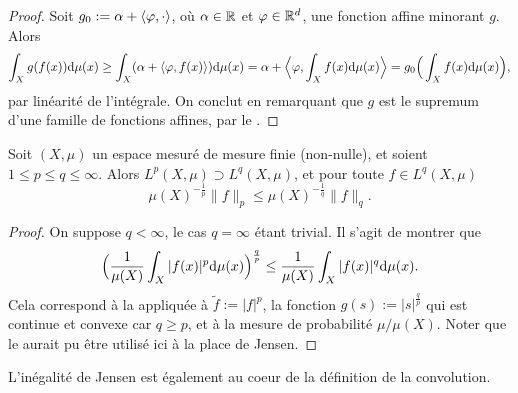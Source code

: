 \begin{proof}
	Soit $g_0 := \alpha + \langle\varphi,\cdot\rangle$, où $\alpha \in \mathbb{R}$ et $\varphi \in \mathbb{R}^d$, une fonction affine minorant $g$. Alors 
	\begin{equation*}
		\int_X g(f(x)) \mathrm{d} \mu(x) \geq \int_X (\alpha + \langle\varphi,f(x)\rangle) \mathrm{d} \mu(x) = \alpha + \Big\langle\varphi, \int_X f(x) \mathrm{d} \mu(x)\Big\rangle = g_0\Big(\int_X f(x) \mathrm{d} \mu(x)\Big),
	\end{equation*}
	par linéarité de l'intégrale.
	On conclut en remarquant que $g$ est le supremum d'une famille de fonctions affines, par le . %
\end{proof}


\begin{corollary}
\label{corol:lpInclusLq}
%
	Soit $(X,\mu)$ un espace mesuré de mesure finie (non-nulle), et soient $1 \leq p \leq q \leq \infty$. Alors $L^p(X,\mu) \supset L^q(X,\mu)$, et pour toute $f \in L^q(X,\mu)$ 
\begin{equation*}
	\mu(X)^{-\frac 1 p} \|f\|_p \leq \mu(X)^{-\frac 1 q} \|f\|_q.
\end{equation*}
\end{corollary}

\begin{proof}
On suppose $q<\infty$, le cas $q=\infty$ étant trivial.
Il s'agit de montrer que 
\begin{equation*}
	\Big(\frac 1 {\mu(X)} \int_X |f(x)|^p \mathrm{d} \mu(x)\Big)^{\frac q p} \leq \frac 1 {\mu(X)}\int_X |f(x)|^q \mathrm{d} \mu(x).
\end{equation*}
Cela correspond à la  appliquée à $\tilde f := |f|^p$, la fonction $g(s) := |s|^{\frac q p}$ qui est continue et convexe car $q\geq p$, et à la mesure de probabilité $\mu/\mu(X)$.
Noter que le  aurait pu être utilisé ici à la place de Jensen. 
\end{proof}

L'inégalité de Jensen est également au coeur de la définition de la convolution.

